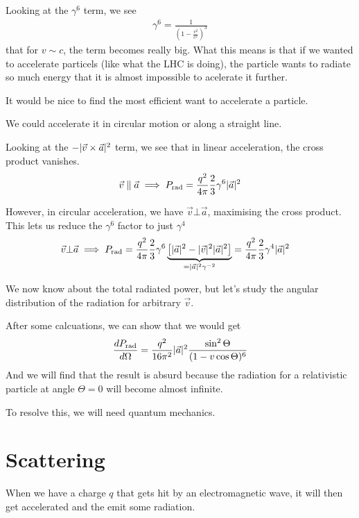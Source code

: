 Looking at the $\gamma^{6}$ term, we see
\begin{align*}
  \gamma^{6} = \frac{1}{\left(
    1 - \frac{v^{2}}{c^{2}}
  \right)^{3}}
\end{align*}
that for $v \sim c$, the term becomes really big.
What this means is that if we wanted to accelerate particels (like what the LHC is doing), 
the particle wants to radiate so much energy that it is almost impossible to acelerate it further.

It would be nice to find the most efficient want to accelerate a particle.

We could accelerate it in circular motion or along a straight line.


Looking at the $- \vert\vec{v} \times \vec{a}\vert^{2}$ term, we see that in linear acceleration, the cross product vanishes.
\begin{align*}
  \vec{v} \parallel \vec{a} \implies P_{\text{rad}} = \frac{q^{2}}{4 \pi} \frac{2}{3} \gamma^{6} \vert\vec{a}\vert^{2}
\end{align*}

However, in circular acceleration, we have $\vec{v} \bot \vec{a}$, maximising the cross product.
This lets us reduce the $\gamma^{6}$ factor to just $\gamma^{4}$
\begin{align*}
\vec{v} \bot \vec{a} \implies
  P_{\text{rad}} 
  &= \frac{q^{2}}{4 \pi} \frac{2}{3} \gamma^{6} \underbrace{\left[
  \vert\vec{a}\vert^{2} - \vert\vec{v}\vert^{2} \vert\vec{a}\vert^{2}\right]}_{= \vert\vec{a}\vert^{2} \gamma^{-2}} = \frac{q^{2}}{4 \pi} \frac{2}{3} \gamma^{4} \vert\vec{a}\vert^{2}
\end{align*}


We now know about the total radiated power, but let's study the angular distribution of the radiation for arbitrary $\vec{v}$.

After some calcuations, we can show that we would get
\begin{align*}
  \frac{d P_{\text{rad}}}{d \Omega} = \frac{q^{2}}{16 \pi^{2}} \vert\vec{a}\vert^{2} \frac{\sin^{2} \Theta}{(1 - v \cos \Theta)^{6}}
\end{align*}
And we will find that the result is absurd because the radiation for a relativistic particle at angle $\Theta= 0$ will become almost infinite.

To resolve this, we will need quantum mechanics.


\section{Scattering}
When we have a charge $q$ that gets hit by an electromagnetic wave, it will then get accelerated and the emit some radiation.

